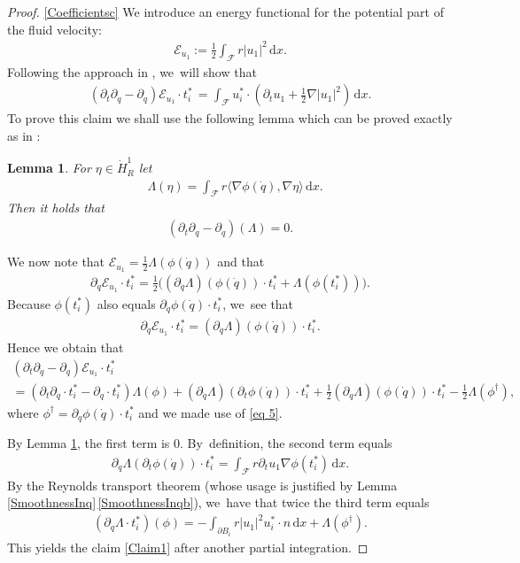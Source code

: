 \documentclass[JEP,XML,SOM,Unicode,published]{cedram}
\newtheorem{lemma}[theorem]{Lemma}
\theoremstyle{definition}
\newcommand\scalar[2]{\langle #1,#2\rangle}
\newcommand\eq{=}
\newcommand\dd{\,\mathrm{d}}
\newcommand\dx{\dd x}
\let\de\partial
\begin{document}
\begin{proof}
\eqref{Coefficientsc}
We introduce an energy functional for the potential part of the fluid velocity:
\begin{align*}
\mathcal{E}_{u_1}:=\frac{1}{2}\int_{\mathcal{F}} r|u_1|^2\dx.
\end{align*}
Following the approach in \cite{Munnier5}, we~will show that
\begin{align}\label{Claim1}
(\de_t\de_{\dot{q}}-\de_{q})\mathcal{E}_{u_1}\cdot t_i^*\,=\int_{\mathcal{F}}u_i^*\cdot(\de_tu_1+\frac{1}{2}\nabla|u_1|^2)\dx.
\end{align}
To prove this claim we shall use the following lemma which can be proved exactly as in \cite[Lem.\,5.1]{Munnier5}: \begin{lemma}\label{deriForm}
For $\eta\in \dot{H}_R^1$ let
\begin{align*}&\Lambda(\eta)\eq\int_{\mathcal{F}}r\scalar{\nabla\phi(\dot{q})}{\nabla \eta} \dx.
\end{align*}
Then it holds that
\begin{align*}
(\de_t\de_{\dot{q}}-\de_q)(\Lambda)\eq0.
\end{align*}\end{lemma}
We now note that
$\mathcal{E}_{u_1}\eq\frac{1}{2}\Lambda(\phi(\dot{q}))$ and that
\begin{align*}
\de_{\dot{q}}\mathcal{E}_{u_1}\cdot t_i^*\eq\frac{1}{2}\bigl((\de_{\dot{q}}\Lambda)(\phi(\dot{q}))\cdot t_i^*+\Lambda(\phi(t_i^*))\bigr).
\end{align*}
Because $\phi(t_i^*)$ also equals $\de_{\dot{q}}\phi(\dot{q})\cdot t_i^*$, we~see that
\begin{align}\label{eq 5}
\de_{\dot{q}}\mathcal{E}_{u_1}\cdot t_i^*\eq(\de_{\dot{q}}\Lambda)(\phi(\dot{q}))\cdot t_i^*.
\end{align}
Hence we obtain that
\begin{multline*}
(\de_t\de_{\dot{q}}-\de_{q})\mathcal{E}_{u_1}\cdot t_i^*\\
\eq\left(\de_t\de_{\dot{q}}\cdot t_i^*-\de_q\cdot t_i^*\right)\Lambda(\phi)
+(\de_{\dot{q}}\Lambda)(\de_t\phi(\dot{q}))\cdot t_i^*
+\frac{1}{2}(\de_q\Lambda)(\phi(\dot{q}))\cdot t_i^*
-\frac{1}{2}\Lambda(\phi^\dagger),
\end{multline*}
where $\phi^\dagger=\de_q\phi(\dot{q})\cdot t_i^*$ and we made use of \eqref{eq 5}.

By Lemma \ref{deriForm}, the first term is $0$. By~definition, the second term equals
\begin{align*}
\de_{\dot{q}}\Lambda(\de_t\phi(\dot{q}))\cdot t_i^*\eq\int_{\mathcal{F}}r\de_tu_1\nabla \phi(t_i^*)\dx.
\end{align*}
By the Reynolds transport theorem (whose usage is justified by Lemma \ref{SmoothnessInq}\,\eqref{SmoothnessInqb}), we~have that twice the third term equals
\begin{align*}
(\de_q\Lambda\cdot t_i^*)(\phi)\eq-\int_{\de B_i}r|u_1|^2u_i^*\cdot n\dx+\Lambda(\phi^\dagger).
\end{align*}
This yields the claim \eqref{Claim1} after another partial integration.


\end{proof}
\end{document}
